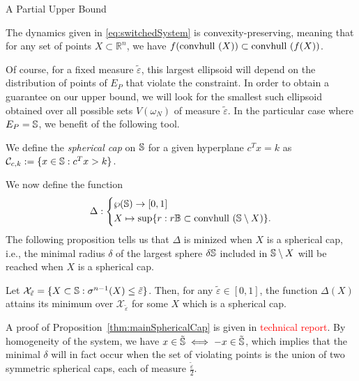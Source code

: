 \begin{subsection}{A Partial Upper Bound}
\begin{property}\label{property:convpres}
The dynamics given in \eqref{eq:switchedSystem} is convexity-preserving, meaning that for any set of points $X \subset \mathbb{R}^n$, we have $f(\mbox{convhull }({X})) \subset \mbox{convhull }(f(X))$.
\end{property}

Of course, for a fixed measure $\tilde{\varepsilon}$, this largest ellipsoid will depend on the distribution of points of $E_P$ that violate the constraint. In order to obtain a guarantee on our upper bound, we will look for the smallest such ellipsoid obtained over all possible sets $V(\omega_N)$ of measure $\tilde{\varepsilon}$. In the particular case where $E_P = \mathbb{S}$, we benefit of the following tool.
\begin{defn}
We define the \emph{spherical cap} on $\mathbb{S}$ for a given hyperplane $c^Tx = k$ as $\mathcal{C}_{c,k} := \{x \in \mathbb{S} : c^Tx >k\}$.
\end{defn}
We now define the function 
\begin{equation}\label{shrinkage}
\Delta: \left\{
    \begin{split}
    &\wp(\mathbb{S}) \to [0,1]\\ 
    &X \mapsto \sup \{r: r\mathbb{B} \subset \mbox{convhull }(\mathbb{S} \setminus X)\}.
    \end{split}
  \right.
\end{equation}
The following proposition tells us that $\Delta$ is minized when $X$ is a spherical cap, i.e., the minimal radius $\delta$ of the largest sphere $\delta \mathbb{S}$ included in $\mathbb{S} \setminus X$ will be reached when $X$ is a spherical cap.
\begin{prop}\label{thm:mainSphericalCap}
Let $\mathcal{X}_{\tilde{\varepsilon}} = \{X \subset \mathbb{S}: \sigma^{n-1}(X) \leq \tilde{\varepsilon}\}$. Then, for any $\tilde{\varepsilon} \in [0,1]$, the function $\Delta(X)$ attains its minimum over $\mathcal{X}_{\tilde{\varepsilon}}$ for some $X$ which is a spherical cap.
\end{prop}
A proof of Proposition~\ref{thm:mainSphericalCap} is given in \textcolor{red}{technical report}. By homogeneity of the system, we have $x \in \tilde{\mathbb{S}} \iff -x \in \tilde{\mathbb{S}}$, which implies that the minimal $\delta$ will in fact occur when the set of violating points is the union of two symmetric spherical caps, each of measure $\frac{\tilde{\varepsilon}}{2}$.


\end{subsection}
